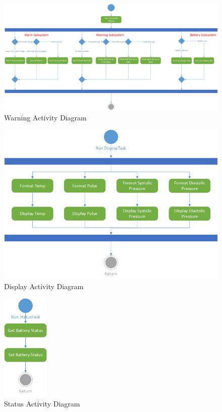 \documentclass[12pt]{article} %
\begin{document}
    \begin{figure}
      \centering
      \includegraphics[width=\textwidth]{../design/warning_activity.png}
      \caption{Warning Activity Diagram}
      \label{fig:warningActivity}
    \end{figure}

    \begin{figure}
      \centering
      \includegraphics[width=\textwidth]{../design/display_activity.png}
      \caption{Display Activity Diagram}
      \label{fig:displayActivity}
    \end{figure}

    \begin{figure}
      \centering
      \includegraphics[width=0.2\textwidth]{../design/Status_activity.png}
      \caption{Status Activity Diagram}
      \label{fig:statusActivity}
    \end{figure}
\end{document}
